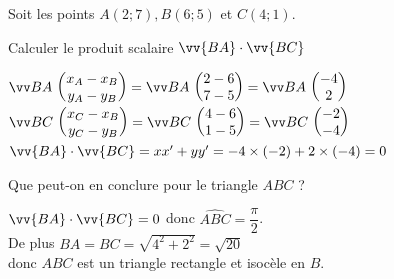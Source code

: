 \documentclass[12pt,a4paper]{article}  %
\begin{document}
\vspace{-0.3cm}
\exerciceDS{ - ( \textcolor{red}{2,5 points} )}
Soit les points $A(2 ; 7), B(6 ; 5)$ et $C(4 ; 1)$.
\begin{enumMet}
	\item Calculer le produit scalaire $\vv{B A} \cdot \vv{B C}$\quad {}\\
	\begin{corrBox}
		$\Coord{BA}{x_A-x_B}{y_A-y_B}=\Coord{BA}{2-6}{7-5}=\Coord{BA}{-4}{2}$\\
		$\Coord{BC}{x_C-x_B}{y_C-y_B}=\Coord{BC}{4-6}{1-5}=\Coord{BC}{-2}{-4}$\\
		$\vv{B A} \cdot \vv{B C}=x x^{\prime}+y y^{\prime}=-4 \times(-2)+2 \times(-4)=0$
	\end{corrBox}
	\item Que peut-on en conclure pour le triangle $A B C$ ?\quad {}\\
	\begin{corrBox}
		$\vv{B A} \cdot \vv{B C}=0$ donc $\widehat{A B C}=\dfrac{\pi}{2}$.\\
		De plus $B A=B C=\sqrt{4^{2}+2^{2}}=\sqrt{20}$\\
		donc $A B C$ est un triangle rectangle et isocèle en $B$.
	\end{corrBox}
\end{enumMet}


\exerciceDS{ - ( \textcolor{red}{2,5 points}  )}
\end{document}
